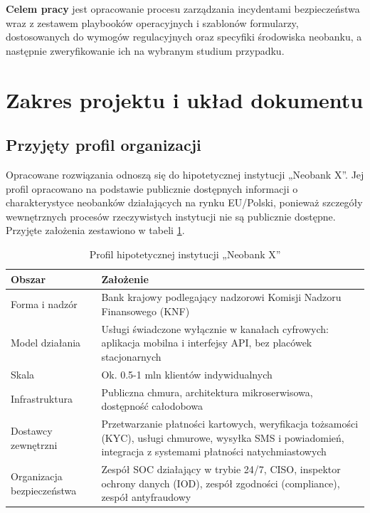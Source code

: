 \textbf{Celem pracy} jest opracowanie procesu zarządzania incydentami bezpieczeństwa wraz z zestawem playbooków operacyjnych i szablonów formularzy, dostosowanych do wymogów regulacyjnych oraz specyfiki środowiska neobanku, a następnie zweryfikowanie ich na wybranym studium przypadku.


\section{Zakres projektu i układ dokumentu}\label{sec:zakres-uklad}
\label{sec:zakres}

\subsection{Przyjęty profil organizacji}
\label{sec:profil}

Opracowane rozwiązania odnoszą się do hipotetycznej instytucji „Neobank X”. Jej profil opracowano na podstawie publicznie dostępnych informacji o charakterystyce neobanków działających na rynku EU/Polski, ponieważ szczegóły wewnętrznych procesów rzeczywistych instytucji nie są publicznie dostępne. Przyjęte założenia zestawiono w tabeli \ref{tab:profil}.

\begin{table}[H]
\centering
\caption{Profil hipotetycznej instytucji „Neobank X”}
\label{tab:profil}
\begin{tabular}{@{}p{4.2cm}p{9.3cm}@{}}
\toprule
\textbf{Obszar} & \textbf{Założenie} \\
\midrule
Forma i nadzór &
Bank krajowy podlegający nadzorowi Komisji Nadzoru Finansowego (KNF) \\
Model działania &
Usługi świadczone wyłącznie w kanałach cyfrowych: aplikacja mobilna i interfejsy API, bez placówek stacjonarnych \\
Skala &
Ok. 0.5-1 mln klientów indywidualnych \\
Infrastruktura &
Publiczna chmura, architektura mikroserwisowa, dostępność całodobowa \\
Dostawcy zewnętrzni &
Przetwarzanie płatności kartowych, weryfikacja tożsamości (KYC), usługi chmurowe, wysyłka SMS i powiadomień, integracja z systemami płatności natychmiastowych \\
Organizacja bezpieczeństwa &
Zespół SOC działający w trybie 24/7, CISO, inspektor ochrony danych (IOD), zespół zgodności (compliance), zespół antyfraudowy \\
\bottomrule
\end{tabular}
\end{table}

